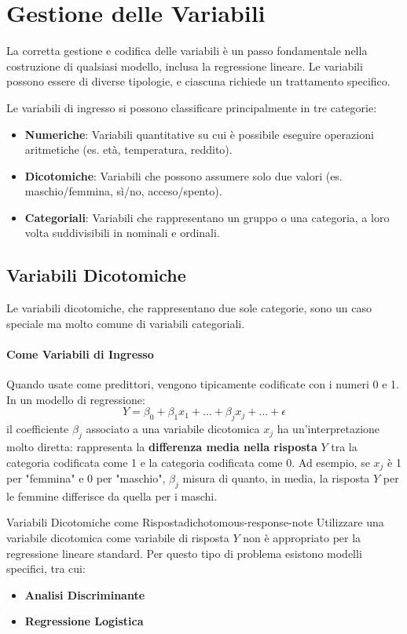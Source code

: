 \section{Gestione delle Variabili}

La corretta gestione e codifica delle variabili è un passo fondamentale nella
costruzione di qualsiasi modello, inclusa la regressione lineare. Le variabili
possono essere di diverse tipologie, e ciascuna richiede un trattamento
specifico.

Le variabili di ingresso si possono classificare principalmente in tre
categorie:
\begin{itemize}
    \item \textbf{Numeriche}: Variabili quantitative su cui è possibile
    eseguire operazioni aritmetiche (es. età, temperatura, reddito).
    \item \textbf{Dicotomiche}: Variabili che possono assumere solo due valori
    (es. maschio/femmina, sì/no, acceso/spento).
    \item \textbf{Categoriali}: Variabili che rappresentano un gruppo o una
    categoria, a loro volta suddivisibili in nominali e ordinali.
\end{itemize}

\subsection{Variabili Dicotomiche}
Le variabili dicotomiche, che rappresentano due sole categorie, sono un caso
speciale ma molto comune di variabili categoriali.

\paragraph{Come Variabili di Ingresso}
Quando usate come predittori, vengono tipicamente codificate con i numeri 0 e 1.
In un modello di regressione:
\[ Y = \beta_0 + \beta_1 x_1 + \dots + \beta_j x_j + \dots + \epsilon \]
il coefficiente \(\beta_j\) associato a una variabile dicotomica \(x_j\) ha
un'interpretazione molto diretta: rappresenta la \textbf{differenza media nella
risposta} \(Y\) tra la categoria codificata come 1 e la categoria codificata
come 0. Ad esempio, se \(x_j\) è 1 per "femmina" e 0 per "maschio", \(\beta_j\)
misura di quanto, in media, la risposta \(Y\) per le femmine differisce da
quella per i maschi.

\begin{nota}{Variabili Dicotomiche come Risposta}{dichotomous-response-note}
Utilizzare una variabile dicotomica come variabile di risposta \(Y\) non è
appropriato per la regressione lineare standard. Per questo tipo di problema
esistono modelli specifici, tra cui:
\begin{itemize}
    \item \textbf{Analisi Discriminante}
    \item \textbf{Regressione Logistica}
\end{itemize}
\end{nota}

